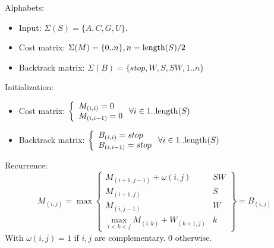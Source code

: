 \documentclass[11pt]{article}
\def\ul{\begin{itemize}}
\def\ule{\end{itemize}}
\begin{document}
Alphabets:\ul
\item Input: $\Sigma(S)=\{A,C,G,U\}$.
\item Cost matrix: $\Sigma(M)=\{0..n\}, n={\rm length}(S)/2$
\item Backtrack matrix: $\Sigma(B)=\{stop,W,S,SW, 1..n\}$
\ule

Initialization: \ul
\item Cost matrix: $\left\{\begin{array}{l} M_{(i,i)}=0 \\ M_{(i,i-1)}=0 \end{array}\right. \forall i \in 1..{\rm length}(S)$
\item Backtrack matrix: $\left\{\begin{array}{l} B_{(i,i)}=stop \\ B_{(i,i-1)}=stop \end{array}\right.  \forall i \in 1..{\rm length}(S)$
\ule

Recurrence:
\[M_{(i,j)}=\max\left\{\begin{array}{l|l}
	M_{(i+1,j-1)}+\omega(i,j) & SW\\
	M_{(i+1,j)} & S\\
	M_{(i,j-1)} & W\\
	\max_{i<k<j}M_{(i,k)}+W_{(k+1,j)} & k
\end{array}\right\} = B_{(i,j)} \]
With $\omega(i,j)=1$ if $i,j$ are complementary. 0 otherwise.
\end{document}
